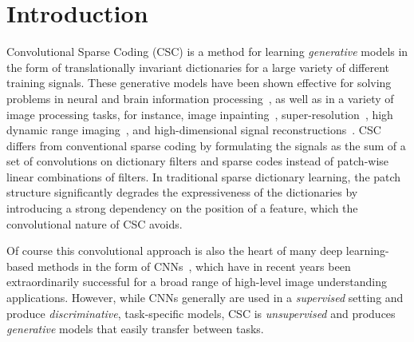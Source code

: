 \section{Introduction}
Convolutional Sparse Coding (CSC) is a method for learning {\em
  generative} models in the form of translationally invariant
dictionaries for a large variety of different training signals.  These
generative models have been shown effective for solving problems in
neural and brain information
processing~\cite{jas2017learning,peter2017sparse}, as well as in a
variety of image processing tasks, for instance, image
inpainting~\cite{heide2015fast},
super-resolution~\cite{gu2015convolutional}, high dynamic range
imaging~\cite{serrano2016convolutional}, and high-dimensional signal
reconstructions~\cite{choudhury2017consensus,bibi2017high}. CSC
differs from conventional sparse coding by formulating the signals as
the sum of a set of convolutions on dictionary filters and sparse
codes instead of patch-wise linear combinations of
filters. In traditional sparse dictionary learning, the patch
structure significantly degrades the expressiveness of the
dictionaries by introducing a strong dependency on the position of a
feature, which the convolutional nature of CSC avoids.

Of course this convolutional approach is also the heart of many deep
learning-based methods in the form of
CNNs~\cite{lecun1998gradient,kavukcuoglu2010learning,krizhevsky2012imagenet},
which have in recent years been extraordinarily successful for a broad
range of high-level image understanding applications. However, while
CNNs generally are used in a {\em supervised} setting and produce {\em
  discriminative}, task-specific models, CSC is {\em unsupervised} and
produces {\em generative} models that easily transfer between tasks.

